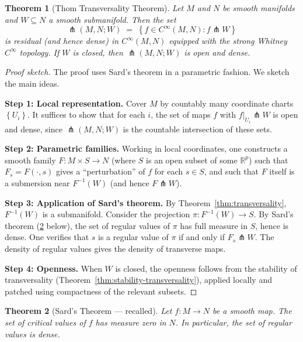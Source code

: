 \documentclass[12pt,a4paper,openany]{book}
\newtheorem{theorem}{Theorem}[section]
\theoremstyle{definition}
\theoremstyle{remark}
\newcommand{\R}{\mathbb{R}}
\newcommand{\set}[1]{\left\{ #1 \right\}}
\begin{document}
\begin{theorem}[Thom Transversality Theorem]\label{thm:thom-transversality}
Let $M$ and $N$ be smooth manifolds and $W \subseteq N$ a smooth submanifold.
Then the set
\[
  \pitchfork(M, N; W) \;=\; \set{f \in C^\infty(M, N) : f \pitchfork W}
\]
is residual (and hence dense) in $C^\infty(M, N)$ equipped with the
strong Whitney $C^\infty$ topology. If $W$ is closed, then
$\pitchfork(M, N; W)$ is open and dense.
\end{theorem}

\begin{proof}[Proof sketch]
The proof uses Sard's theorem in a parametric fashion. We sketch the
main ideas.

\medskip\noindent
\textbf{Step 1: Local representation.}
Cover $M$ by countably many coordinate charts $\set{U_i}$. It suffices to
show that for each $i$, the set of maps $f$ with $f|_{U_i} \pitchfork W$
is open and dense, since $\pitchfork(M, N; W)$ is the countable intersection
of these sets.

\medskip\noindent
\textbf{Step 2: Parametric families.}
Working in local coordinates, one constructs a smooth family
$F \colon M \times S \to N$ (where $S$ is an open subset of some $\R^p$)
such that $F_s = F(\cdot, s)$ gives a ``perturbation'' of $f$ for each
$s \in S$, and such that $F$ itself is a submersion near $F^{-1}(W)$
(and hence $F \pitchfork W$).

\medskip\noindent
\textbf{Step 3: Application of Sard's theorem.}
By Theorem~\ref{thm:transversality}, $F^{-1}(W)$ is a submanifold.
Consider the projection $\pi \colon F^{-1}(W) \to S$. By Sard's theorem
(\ref{thm:sard-recall} below), the set of regular values of $\pi$ has
full measure in $S$, hence is dense. One verifies that $s$ is a regular
value of $\pi$ if and only if $F_s \pitchfork W$. The density of
regular values gives the density of transverse maps.

\medskip\noindent
\textbf{Step 4: Openness.}
When $W$ is closed, the openness follows from the stability of
transversality (Theorem~\ref{thm:stability-transversality}), applied
locally and patched using compactness of the relevant subsets.
\end{proof}

\begin{theorem}[Sard's Theorem --- recalled]\label{thm:sard-recall}
Let $f \colon M \to N$ be a smooth map. The set of critical values of $f$
has measure zero in $N$. In particular, the set of regular values is dense.
\end{theorem}
\end{document}
